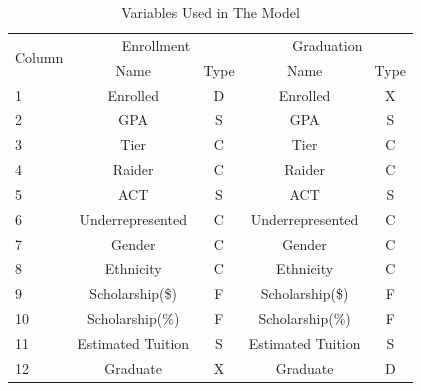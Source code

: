 \documentclass[12pt,english]{report}
\begin{document}
\begin{table}[h]
\centering
\begin{tabular}{|l|c|c|c|c|}
\hline
\multicolumn{1}{|c|}{\multirow{2}{*}{Column}} & \multicolumn{2}{c|}{Enrollment}
& \multicolumn{2}{c|}{Graduation}                            \\ \cline{2-5}
\multicolumn{1}{|c|}{}                        & Name                          &
Type                     & Name                          & Type
\\ \hline
1                                             & Enrolled                      &
D                        & Enrolled                      & X
\\ \hline
2                                             & GPA                           &
S                        & GPA                           & S
\\ \hline
3      & Tier   & C    &   Tier   & C    \\ \hline
4    & Raider     & C   &   Raider  & C   \\ \hline
5   & ACT    & S  &  ACT    & S     \\ \hline
6   & Underrepresented & C     & Underrepresented    & C   \\ \hline
7    & Gender   & C   &  Gender  & C   \\ \hline
8   & Ethnicity    & C     & Ethnicity   & C      \\ \hline
9   & Scholarship(\$)    & F   & Scholarship(\$)     & F    \\ \hline
10  & Scholarship(\%)   & F     & Scholarship(\%)     & F  \\ \hline
11  & Estimated Tuition  & S    & Estimated Tuition  & S   \\ \hline
12  & Graduate   & X     &   Graduate        & D         \\ \hline
\end{tabular}
\caption{Variables Used in The Model}
\end{table}
\end{document}
